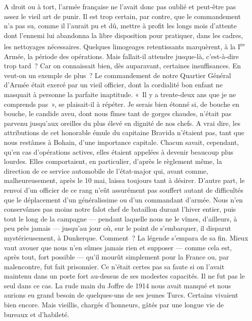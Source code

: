 \documentclass[french,twoside]{book} %
\begin{document}
A droit ou à tort, l’armée française ne l’avait donc pas oublié et peut-être pas assez le vieil art de punir. Il est trop certain, par contre, que le commandement n’a pas su, comme il l’aurait pu et dû, mettre à profit les longs mois d’attente dont l’ennemi lui abandonna la libre disposition pour pratiquer, dans les cadres, les nettoyages nécessaires. Quelques limogeages retentissants marquèrent, à la I\textsuperscript{re} Armée, la période des opérations. Mais fallait-il attendre jusque-là, c’est-à-dire trop tard ? Car on connaissait bien, dès auparavant, certaines insuffisances. En veut-on un exemple de plus ? Le commandement de notre Quartier Général d’Armée était exercé par un vieil officier, dont la cordialité bon enfant ne masquait à personne la parfaite inaptitude. « Il y a trente-deux ans que je ne comprends pas », se plaisait-il à répéter. Je serais bien étonné si, de bouche en bouche, le candide aveu, dont nous fîmes tant de gorges chaudes, n’était pas parvenu jusqu’aux oreilles du plus élevé en dignité de nos chefs. A vrai dire, les attributions de cet honorable émule du   capitaine Bravida n’étaient pas, tant que nous restâmes à Bohain, d’une importance capitale. Chacun savait, cependant, qu’en cas d’opérations actives, elles étaient appelées à devenir beaucoup plus lourdes. Elles comportaient, en particulier, d’après le règlement même, la direction de ce service automobile de l’état-major qui, avant comme, malheureusement, après le 10 mai, laissa toujours tant à désirer. D’autre part, le renvoi d’un officier de ce rang n’eût assurément pas souffert autant de difficultés que le déplacement d’un généralissime ou d’un commandant d’armée. Nous n’en conservâmes pas moins notre falot chef de bataillon durant l’hiver entier, puis tout le long de la campagne — pendant laquelle nous ne le vîmes, d’ailleurs, à peu près jamais — jusqu’au jour où, sur le point de s’embarquer, il disparut mystérieusement, à Dunkerque. Comment ? La légende s’empara de sa fin. Mieux vaut avouer que nous n’en sûmes jamais rien et supposer — comme cela est, après tout, fort possible — qu’il mourût simplement pour la France ou, par malencontre, fut fait prisonnier. Ce n’était certes pas sa faute si on l’avait maintenu dans un poste fort au-dessus de ses modestes capacités. Il ne fut pas le seul dans ce cas. La rude main du Joffre de 1914 nous avait manqué et nous aurions eu grand besoin de quelques-uns de ses jeunes Turcs. Certains vivaient bien encore. Mais vieillis, chargés d’honneurs, gâtés par une longue vie de bureaux et d’habileté.\par
\end{document}
